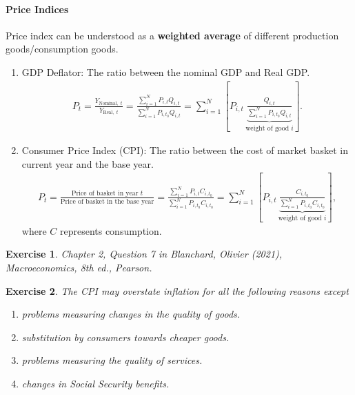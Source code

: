 \documentclass[12pt]{article}
\newtheorem{exercise}{Exercise}
\numberwithin{equation}{section}
\begin{document}
\paragraph{Price Indices}
Price index can be understood as a \textbf{weighted average} of different production goods/consumption goods.
\begin{enumerate}[label=(\arabic*)]
    \item GDP Deflator: The ratio between the nominal GDP and Real GDP.
    \begin{align*}
        P_t = \frac{Y_{\text{Nominal, }\, t}}{Y_{\text{Real, }\, t}} 
        = \frac{\sum_{i=1}^N P_{i,t}Q_{i,t}}{\sum_{i=1}^N P_{i,t_0}Q_{i,t}} 
        = \sum_{i=1}^N \left[P_{i,t}\, \underbrace{\frac{Q_{i,t}}{\sum_{i=1}^N P_{i,t_0}Q_{i,t}}}_{\text{weight of good } i}\right].
    \end{align*}
    \item Consumer Price Index (CPI): The ratio between the cost of market basket in current year and the base year.
    \begin{align*}
        P_t = \frac{\text{Price of basket in year } t}{\text{Price of basket in the base year}} 
        = \frac{\sum_{i=1}^N P_{i,t}C_{i,t_0}}{\sum_{i=1}^N P_{i,t_0}C_{i,t_0}} 
        = \sum_{i=1}^N \left[P_{i,t}\, \underbrace{\frac{C_{i,t_0}}{\sum_{i=1}^N P_{i,t_0}C_{i,t_0}}}_{\text{weight of good } i}\right],
    \end{align*}
    where $C$ represents consumption.
\end{enumerate}

\begin{exercise}
    Chapter 2, Question 7 in Blanchard, Olivier (2021), \textit{Macroeconomics}, 8th ed., Pearson.
\end{exercise}

\begin{exercise}
    The CPI may overstate inflation for all the following reasons except
    \begin{enumerate}[label=\Alph*.]
        \item problems measuring changes in the quality of goods.
        \item substitution by consumers towards cheaper goods.
        \item problems measuring the quality of services.
        \item changes in Social Security benefits.
    \end{enumerate}
\end{exercise}
\end{document}
